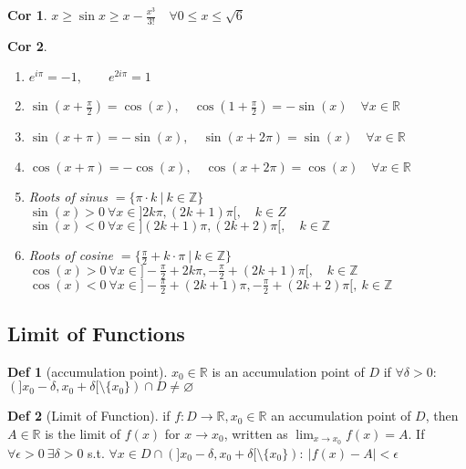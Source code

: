 \documentclass[a4paper, 10pt]{article}
\newtheorem*{corollary}{Cor}
\theoremstyle{definition}
\newtheorem*{definition}{Def}
\theoremstyle{named}
\newcommand{\R}{\mathbb{R}}
\newcommand{\Z}{\mathbb{Z}}
\begin{document}
\begin{corollary}
    $x \geq \sin x \geq x - \frac{x^3}{3!} \quad \forall 0 \leq x \leq \sqrt{6}$
\end{corollary}

\begin{corollary}
    \begin{enumerate}
        \item $e^{i\pi}=-1, \qquad e^{2i\pi}=1$
        \item $\sin(x+\frac{\pi}{2}) = \cos(x), \quad \cos(1+\frac{\pi}{2}) = -\sin(x) \quad \forall x \in \R$
        \item $\sin(x+\pi)=-\sin(x), \quad \sin(x+2\pi) = \sin(x) \quad \forall x \in \R$
        \item $\cos(x+\pi) = -\cos(x), \quad \cos(x+2\pi) = \cos(x) \quad \forall x \in \R$
        \item Roots of sinus $= \{\pi \cdot k \ | \ k \in \Z \}$ \\ 
        $\sin(x) > 0 \ \forall x \in ] 2k \pi, (2k + 1)\pi [, \quad k \in Z$ \\
        $\sin(x) < 0 \ \forall x \in ] (2k + 1)\pi, (2k + 2) \pi [, \quad k \in \Z$
        \item Roots of cosine $= \{\frac{\pi}{2} + k \cdot \pi \ | \ k \in \Z \}$ \\
        $\cos(x) > 0 \ \forall x \in ] - \frac{\pi}{2} + 2k \pi, - \frac{\pi}{2} + (2k + 1)\pi [, \quad k \in \Z$ \\
        $\cos(x) < 0 \ \forall x \in ] -\frac{\pi}{2} + (2k + 1) \pi, - \frac{\pi}{2} + (2k + 2) \pi [, \ k \in \Z$
    \end{enumerate}
\end{corollary}

\subsection{Limit of Functions}
\begin{definition}[accumulation point]
    $x_0 \in \R$ is an accumulation point of $D$ if $\forall \delta > 0$: $(]x_0 - \delta, x_0 + \delta[ \setminus \{x_0\}) \cap D \neq \varnothing$
\end{definition}

\begin{definition}[Limit of Function]
    if $f : D \to \R, x_0 \in \R$ an accumulation point of $D$, then $A \in \R$ is the limit of $f(x)$ for $x \to x_0$, written as $\lim_{x \to x_0} f(x) = A$. If $\forall \epsilon > 0 \ \exists \delta > 0$ s.t. $\forall x \in D \cap (]x_0 - \delta, x_0 + \delta[ \setminus \{x_0\}): \ |f(x) - A| < \epsilon$
\end{definition}
\end{document}
